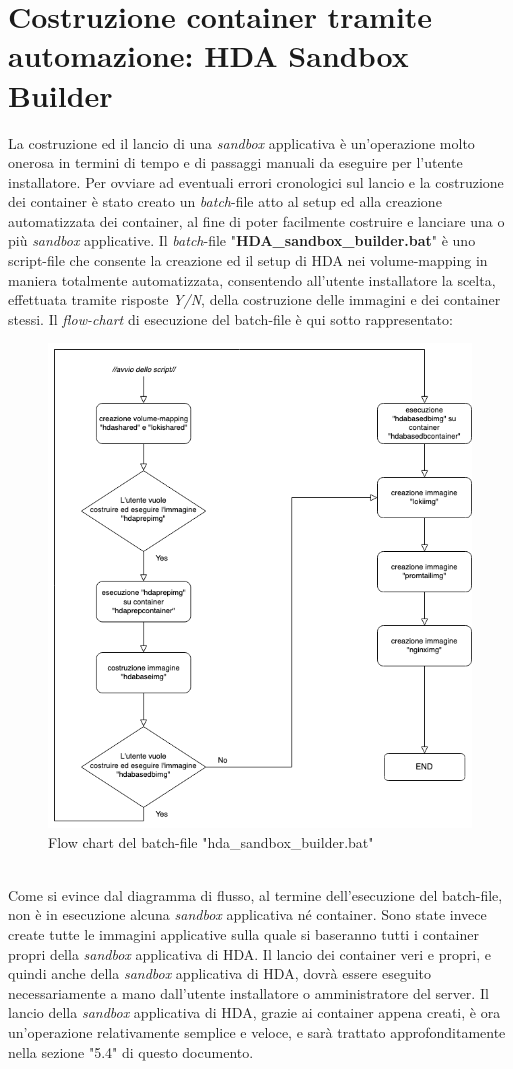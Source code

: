 \newpage
\section{Costruzione container tramite automazione: HDA Sandbox Builder}
La costruzione ed il lancio di una \textit{sandbox} applicativa è un'operazione molto onerosa in termini di tempo e di passaggi manuali da eseguire per l'utente installatore.
Per ovviare ad eventuali errori cronologici sul lancio e la costruzione dei container è stato creato un \textit{batch}-file atto al setup ed alla creazione automatizzata dei container, al fine di poter facilmente costruire e lanciare una o più \textit{sandbox} applicative.
Il \textit{batch}-file "\textbf{HDA\_sandbox\_builder.bat}" è uno script-file che consente la creazione ed il setup di HDA nei volume-mapping in maniera totalmente automatizzata, consentendo all'utente installatore la scelta, effettuata tramite risposte \textit{Y/N}, della costruzione delle immagini e dei container stessi.
Il \textit{flow-chart} di esecuzione del batch-file è qui sotto rappresentato:
\\
\begin{figure}[!h]     
\centering 
    \includegraphics[width=0.8 \columnwidth]{immagini/img/hda_sandbox_builder_fc} 
    \caption{Flow chart del batch-file "hda\_sandbox\_builder.bat"}
\end{figure}\\
Come si evince dal diagramma di flusso, al termine dell'esecuzione del batch-file, non è in esecuzione alcuna \textit{sandbox} applicativa né container. Sono state invece create tutte le immagini applicative sulla quale si baseranno tutti i container propri della \textit{sandbox} applicativa di HDA.
Il lancio dei container veri e propri, e quindi anche della \textit{sandbox} applicativa di HDA, dovrà essere eseguito necessariamente a mano dall'utente installatore o amministratore del server.
Il lancio della \textit{sandbox} applicativa di HDA, grazie ai container appena creati, è ora un'operazione relativamente semplice e veloce, e sarà trattato approfonditamente nella sezione "5.4" di questo documento.
\newpage
